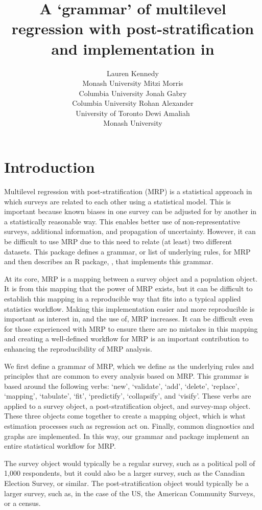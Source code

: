 \documentclass[
]{jss}
\author{
Lauren Kennedy\\Monash University \And Mitzi Morris\\Columbia
University \And Jonah Gabry\\Columbia University \And Rohan
Alexander\\University of Toronto \And Dewi Amaliah\\Monash University
}
\title{\pkg{MRP-Kit} A `grammar' of multilevel regression with
post-stratification and implementation in \proglang{R}}
\begin{document}
\section[Introduction]{Introduction} \label{sec:intro}

Multilevel regression with post-stratification (MRP) is a statistical
approach in which surveys are related to each other using a statistical
model. This is important because known biases in one survey can be
adjusted for by another in a statistically reasonable way. This enables
better use of non-representative surveys, additional information, and
propagation of uncertainty. However, it can be difficult to use MRP due
to this need to relate (at least) two different datasets. This package
defines a grammar, or list of underlying rules, for MRP and then
describes an R package, , that implements this grammar.

At its core, MRP is a mapping between a survey object and a population
object. It is from this mapping that the power of MRP exists, but it can
be difficult to establish this mapping in a reproducible way that fits
into a typical applied statistics workflow. Making this implementation
easier and more reproducible is important as interest in, and the use
of, MRP increases. It can be difficult even for those experienced with
MRP to ensure there are no mistakes in this mapping and creating a
well-defined workflow for MRP is an important contribution to enhancing
the reproducibility of MRP analysis.

We first define a grammar of MRP, which we define as the underlying
rules and principles that are common to every analysis based on MRP.
This grammar is based around the following verbs: `new', `validate',
`add', `delete', `replace', `mapping', `tabulate', `fit', `predictify',
`collapsify', and `visify'. These verbs are applied to a survey object,
a post-stratification object, and survey-map object. These three objects
come together to create a mapping object, which is what estimation
processes such as regression act on. Finally, common diagnostics and
graphs are implemented. In this way, our grammar and package implement
an entire statistical workflow for MRP.

The survey object would typically be a regular survey, such as a
political poll of 1,000 respondents, but it could also be a larger
survey, such as the Canadian Election Survey, or similar. The
post-stratification object would typically be a larger survey, such as,
in the case of the US, the American Community Surveys, or a census.
\end{document}
